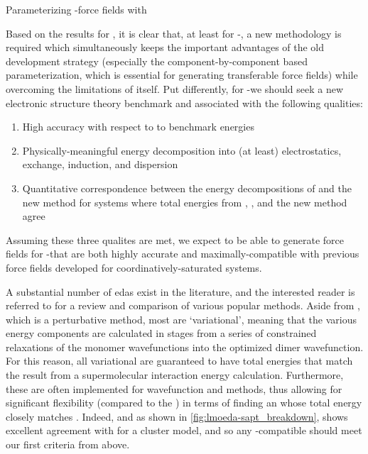 \begin{section}{Parameterizing \cus-\mof force fields with \lmoeda}
\label{sec:lmoeda-theory}

Based on the results for \mgmof, it is clear that, at least for \cus-\mofs, a
new methodology is required which simultaneously keeps the important advantages of the
old development strategy (especially the component-by-component based parameterization,
which is essential for generating transferable force fields) while overcoming
the limitations of \sapt itself. Put differently, for \cus-\mofs we should
seek a new electronic structure theory benchmark and associated \eda 
with the following qualities:
%
\begin{enumerate}
\item High accuracy with respect to to \ccsdtf benchmark energies
\item Physically-meaningful energy decomposition into (at least)
electrostatics, exchange, induction, and dispersion
\item Quantitative correspondence
between the energy decompositions of \sapt and the new method for systems
where total energies from \sapt, \ccsdtf, and the new method agree
\end{enumerate}
%
Assuming these three qualites are met, we expect to be able to generate force
fields for \cus-\mofs that are both highly accurate and maximally-compatible
with previous force fields developed for coordinatively-saturated \mof
systems. 

A substantial number of \glspl{eda} exist in the literature,
and the interested reader is referred to  for a
review and comparison of various popular methods. Aside from \sapt, which is a
perturbative method, most \edas are `variational', meaning that the
various energy components are calculated in stages from a series of constrained
relaxations of the monomer wavefunctions into the optimized
dimer wavefunction. For this reason, all variational \edas
are guaranteed to have total energies that match the result from a supermolecular
interaction energy calculation. Furthermore, these \edas are often implemented
for wavefunction and \dft methods, thus allowing for significant
flexibility (compared to the \sapt \eda) in terms of finding an \eda whose
total energy closely matches \ccsdtf. Indeed, and 
as shown in
\cref{fig:lmoeda-sapt_breakdown}, \pbeod
shows excellent agreement with \ccsdtf for a \mgmof cluster model, 
and so any \dft-compatible \eda should meet our first criteria from above.


\end{section}
